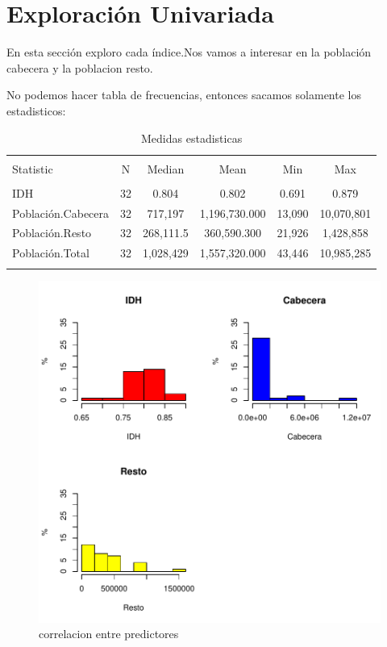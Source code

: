 
\section{Exploración Univariada}\label{univariada}

En esta sección exploro cada índice.Nos vamos a interesar en la población cabecera y la poblacion resto. 


No podemos hacer tabla de frecuencias, entonces sacamos solamente los estadisticos:

\begin{table}[!htbp] \centering 
  \caption{Medidas estadisticas} 
  \label{stats} 
\begin{tabular}{@{\extracolsep{5pt}}lccccc} 
\\[-1.8ex]\hline 
\hline \\[-1.8ex] 
Statistic & \multicolumn{1}{c}{N} & \multicolumn{1}{c}{Median} & \multicolumn{1}{c}{Mean} & \multicolumn{1}{c}{Min} & \multicolumn{1}{c}{Max} \\ 
\hline \\[-1.8ex] 
IDH & 32 & 0.804 & 0.802 & 0.691 & 0.879 \\ 
Población.Cabecera & 32 & 717,197 & 1,196,730.000 & 13,090 & 10,070,801 \\ 
Población.Resto & 32 & 268,111.5 & 360,590.300 & 21,926 & 1,428,858 \\ 
Población.Total & 32 & 1,028,429 & 1,557,320.000 & 43,446 & 10,985,285 \\ 
\hline \\[-1.8ex] 
\end{tabular} 
\end{table} 
\begin{figure}[h]
\centering
\begin{adjustbox}{width=13cm,height=9cm,clip,trim=0cm 0cm 0cm 0cm}
\includegraphics{Proyecto_Final_Univariada-corrPlotX}
\end{adjustbox}
\caption{correlacion entre predictores}
\label{corrPlotX}
\end{figure}

\clearpage

\endinput
